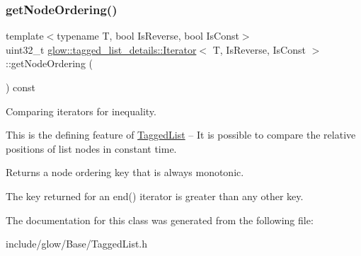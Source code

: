 \subsubsection{\texorpdfstring{get\+Node\+Ordering()}{getNodeOrdering()}}
{\footnotesize\ttfamily template$<$typename T, bool Is\+Reverse, bool Is\+Const$>$ \\
uint32\+\_\+t \hyperlink{classglow_1_1tagged__list__details_1_1_iterator}{glow\+::tagged\+\_\+list\+\_\+details\+::\+Iterator}$<$ T, Is\+Reverse, Is\+Const $>$\+::get\+Node\+Ordering (\begin{DoxyParamCaption}{ }\end{DoxyParamCaption}) const\hspace{0.3cm}{\ttfamily [inline]}}

Comparing iterators for inequality.

This is the defining feature of \hyperlink{classglow_1_1_tagged_list}{Tagged\+List} -- It is possible to compare the relative positions of list nodes in constant time.

Returns a node ordering key that is always monotonic.

The key returned for an end() iterator is greater than any other key. 

The documentation for this class was generated from the following file\+:\begin{DoxyCompactItemize}
\item 
include/glow/\+Base/Tagged\+List.\+h\end{DoxyCompactItemize}
